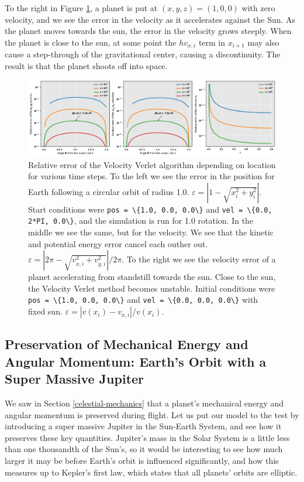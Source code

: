 \documentclass[]{article}
\begin{document}
To the right in Figure \ref{fig:error}, a planet is put at $(x,y,z)=(1,0,0)$ with zero velocity, and we see the error in the velocity as it accelerates against the Sun. As the planet moves towards the sun, the error in the velocity grows steeply. When the planet is close to the sun, at some point the $hv_{x,i}$ term in $x_{i+1}$ may also cause a step-through of the gravitational center, causing a discontinuity. The result is that the planet shoots off into space.

\begin{figure}[!htb]
	\centering
	\includegraphics[width=1\linewidth]{error.png}
	\caption{Relative error of the Velocity Verlet algorithm depending on location for various time steps. To the left we see the error in the position for Earth following a circular orbit of radius 1.0. $\varepsilon = |1 - \sqrt{x_i^2 + y_i^2}|$. Start conditions were \lstinline|pos = \{1.0, 0.0, 0.0\}| and \lstinline|vel = \{0.0, 2*PI, 0.0\}|, and the simulation is run for 1.0 rotation. In the middle we see the same, but for the velocity. We see that the kinetic and potential energy error cancel each outher out. $\varepsilon = |2\pi - \sqrt{v_{x,i}^2 + v_{y,i}^2}|/2\pi$. To the right we see the velocity error of a planet accelerating from standstill towards the sun. Close to the sun, the Velocity Verlet method becomes unstable. Initial conditions were \lstinline|pos = \{1.0, 0.0, 0.0\}| and \lstinline|vel = \{0.0, 0.0, 0.0\}| with fixed sun. $\varepsilon = |v(x_i)-v_{x,i}|/v(x_i)$.}
	\label{fig:error}
\end{figure}

\subsection{Preservation of Mechanical Energy and Angular Momentum: Earth's Orbit with a Super Massive Jupiter}
We saw in Section \ref{celestial-mechanics} that a planet's mechanical energy and angular momentum is preserved during flight. Let us put our model to the test by introducing a super massive Jupiter in the Sun-Earth System, and see how it preserves these key quantities. Jupiter's mass in the Solar System is a little less than one thousandth of the Sun's, so it would be interesting to see how much larger it may be before Earth's orbit is influenced significantly, and how this measures up to Kepler's first law, which states that all planets' orbits are elliptic.
\end{document}
